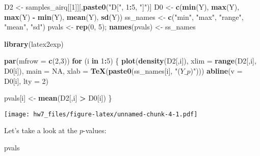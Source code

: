 \documentclass[
]{article}
\newenvironment{Shaded}{\begin{snugshade}}{\end{snugshade}}
\newcommand{\AttributeTok}[1]{\textcolor[rgb]{0.13,0.29,0.53}{#1}}
\newcommand{\ConstantTok}[1]{\textcolor[rgb]{0.56,0.35,0.01}{#1}}
\newcommand{\ControlFlowTok}[1]{\textcolor[rgb]{0.13,0.29,0.53}{\textbf{#1}}}
\newcommand{\DecValTok}[1]{\textcolor[rgb]{0.00,0.00,0.81}{#1}}
\newcommand{\FunctionTok}[1]{\textcolor[rgb]{0.13,0.29,0.53}{\textbf{#1}}}
\newcommand{\NormalTok}[1]{#1}
\newcommand{\OtherTok}[1]{\textcolor[rgb]{0.56,0.35,0.01}{#1}}
\newcommand{\SpecialCharTok}[1]{\textcolor[rgb]{0.81,0.36,0.00}{\textbf{#1}}}
\newcommand{\StringTok}[1]{\textcolor[rgb]{0.31,0.60,0.02}{#1}}
\begin{document}
\begin{Shaded}
\begin{Highlighting}[]
\NormalTok{D2 }\OtherTok{\textless{}{-}}\NormalTok{ samples\_airq[[}\DecValTok{1}\NormalTok{]][,}\FunctionTok{paste0}\NormalTok{(}\StringTok{"D["}\NormalTok{, }\DecValTok{1}\SpecialCharTok{:}\DecValTok{5}\NormalTok{, }\StringTok{"]"}\NormalTok{)]}
\NormalTok{D0 }\OtherTok{\textless{}{-}} \FunctionTok{c}\NormalTok{(}\FunctionTok{min}\NormalTok{(Y), }\FunctionTok{max}\NormalTok{(Y), }\FunctionTok{max}\NormalTok{(Y) }\SpecialCharTok{{-}} \FunctionTok{min}\NormalTok{(Y), }\FunctionTok{mean}\NormalTok{(Y), }\FunctionTok{sd}\NormalTok{(Y))}
\NormalTok{ss\_names }\OtherTok{\textless{}{-}} \FunctionTok{c}\NormalTok{(}\StringTok{"min"}\NormalTok{, }\StringTok{"max"}\NormalTok{, }\StringTok{"range"}\NormalTok{, }\StringTok{"mean"}\NormalTok{, }\StringTok{"sd"}\NormalTok{)}
\NormalTok{pvals }\OtherTok{\textless{}{-}} \FunctionTok{rep}\NormalTok{(}\DecValTok{0}\NormalTok{, }\DecValTok{5}\NormalTok{); }\FunctionTok{names}\NormalTok{(pvals) }\OtherTok{\textless{}{-}}\NormalTok{ ss\_names}

\FunctionTok{library}\NormalTok{(latex2exp)}

\FunctionTok{par}\NormalTok{(}\AttributeTok{mfrow =} \FunctionTok{c}\NormalTok{(}\DecValTok{2}\NormalTok{,}\DecValTok{3}\NormalTok{))}
\ControlFlowTok{for}\NormalTok{ (i }\ControlFlowTok{in} \DecValTok{1}\SpecialCharTok{:}\DecValTok{5}\NormalTok{) \{}
  \FunctionTok{plot}\NormalTok{(}\FunctionTok{density}\NormalTok{(D2[,i]), }\AttributeTok{xlim =} \FunctionTok{range}\NormalTok{(D2[,i], D0[i]),}
       \AttributeTok{main =} \ConstantTok{NA}\NormalTok{, }\AttributeTok{xlab =} \FunctionTok{TeX}\NormalTok{(}\FunctionTok{paste0}\NormalTok{(ss\_names[i], }\StringTok{"($Y\_p$)"}\NormalTok{)))}
  \FunctionTok{abline}\NormalTok{(}\AttributeTok{v =}\NormalTok{ D0[i], }\AttributeTok{lty =} \DecValTok{2}\NormalTok{)}
  
\NormalTok{  pvals[i] }\OtherTok{\textless{}{-}} \FunctionTok{mean}\NormalTok{(D2[,i] }\SpecialCharTok{\textgreater{}}\NormalTok{ D0[i])}
\NormalTok{\}}
\end{Highlighting}
\end{Shaded}

\texttt{[image: hw7\_files/figure-latex/unnamed-chunk-4-1.pdf]}

Let's take a look at the \(p\)-values:

\begin{Shaded}
\begin{Highlighting}[]
\NormalTok{pvals}
\end{Highlighting}
\end{Shaded}
\end{document}

